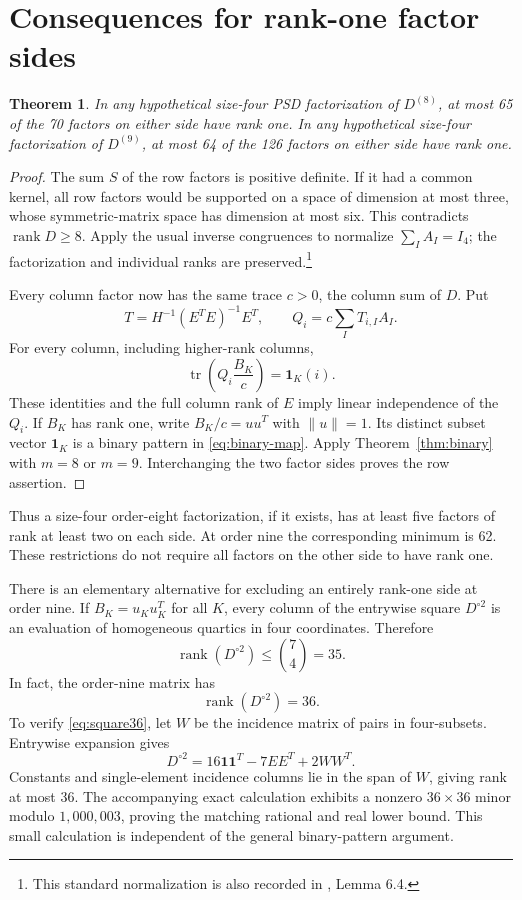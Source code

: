 \documentclass[11pt]{article}
\newtheorem{theorem}{Theorem}[section]
\theoremstyle{remark}\newtheorem{remark}[theorem]{Remark}
\newcommand{\tr}{\operatorname{tr}}
\newcommand{\rank}{\operatorname{rank}}
\newcommand{\one}{\mathbf 1}
\begin{document}
\section{Consequences for rank-one factor sides}
\begin{theorem}\label{thm:pure-count}
In any hypothetical size-four PSD factorization of $D^{(8)}$, at most 65 of the 70 factors on either side have rank one. In any hypothetical size-four factorization of $D^{(9)}$, at most 64 of the 126 factors on either side have rank one.
\end{theorem}
\begin{proof}
The sum $S$ of the row factors is positive definite. If it had a common kernel, all row factors would be supported on a space of dimension at most three, whose symmetric-matrix space has dimension at most six. This contradicts $\rank D\geq8$. Apply the usual inverse congruences to normalize $\sum_I A_I=I_4$; the factorization and individual ranks are preserved.\footnote{This standard normalization is also recorded in \cite{fawzi}, Lemma 6.4.}

Every column factor now has the same trace $c>0$, the column sum of $D$. Put
\[
 T=H^{-1}(E^TE)^{-1}E^T,\qquad
 Q_i=c\sum_I T_{i,I}A_I.
\]
For every column, including higher-rank columns,
\[
 \tr\left(Q_i\frac{B_K}{c}\right)=\one_K(i).
\]
These identities and the full column rank of $E$ imply linear independence of the $Q_i$. If $B_K$ has rank one, write $B_K/c=uu^T$ with $\|u\|=1$. Its distinct subset vector $\one_K$ is a binary pattern in \eqref{eq:binary-map}. Apply Theorem~\ref{thm:binary} with $m=8$ or $m=9$. Interchanging the two factor sides proves the row assertion.
\end{proof}

Thus a size-four order-eight factorization, if it exists, has at least five factors of rank at least two on each side. At order nine the corresponding minimum is 62. These restrictions do not require all factors on the other side to have rank one.

There is an elementary alternative for excluding an entirely rank-one side at order nine. If $B_K=u_Ku_K^T$ for all $K$, every column of the entrywise square $D^{\circ2}$ is an evaluation of homogeneous quartics in four coordinates. Therefore
\begin{equation}\label{eq:powerbound}
 \rank(D^{\circ2})\leq\binom74=35.
\end{equation}
In fact, the order-nine matrix has
\begin{equation}\label{eq:square36}
 \rank(D^{\circ2})=36.
\end{equation}
To verify \eqref{eq:square36}, let $W$ be the incidence matrix of pairs in four-subsets. Entrywise expansion gives
\[
 D^{\circ2}=16\one\one^T-7EE^T+2WW^T.
\]
Constants and single-element incidence columns lie in the span of $W$, giving rank at most 36. The accompanying exact calculation exhibits a nonzero $36\times36$ minor modulo $1{,}000{,}003$, proving the matching rational and real lower bound. This small calculation is independent of the general binary-pattern argument.
\end{document}
